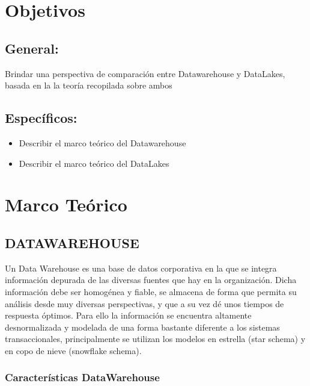 \documentclass[%
 reprint,
 amsmath,amssymb,
 aps,
]{revtex4-1}
\begin{document}
\section{Objetivos}\label{sec:2}
\subsection{General:}
Brindar una perspectiva de comparación entre Datawarehouse y DataLakes, basada en la la teoría recopilada sobre ambos 
\subsection{Específicos:}
\begin{itemize}
	\item Describir el marco teórico del Datawarehouse
	\item Describir el marco teórico del DataLakes
\end{itemize}

\section {Marco Teórico}

\subsection{DATAWAREHOUSE}	
Un Data Warehouse es una base de datos corporativa en la que se integra información depurada de las diversas fuentes que hay en la organización. Dicha
información debe ser homogénea y fiable, se almacena de forma que permita su análisis desde muy diversas perspectivas, y que a su vez dé unos tiempos de
respuesta óptimos. Para ello la información se encuentra altamente desnormalizada y modelada de una forma bastante diferente a los sistemas transaccionales,
principalmente se utilizan los modelos en estrella (star schema) y en copo de nieve (snowflake schema).

\subsubsection{\textbf{Características DataWarehouse}}	
\end{document}
